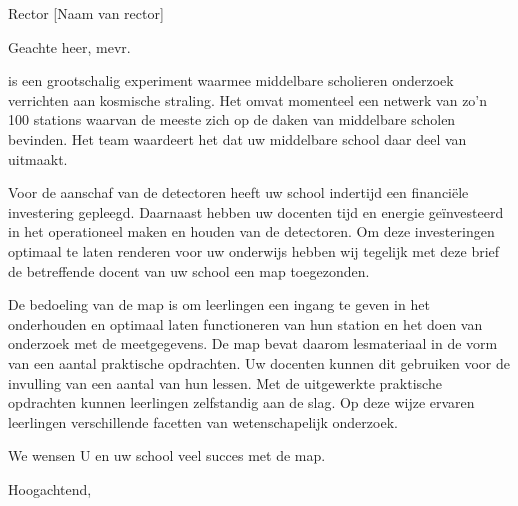 

\signature{Het \hisparc team}
\address{Science Park 105\\
         1098 XG \\
         Amsterdam}



\begin{letter}{Rector [Naam van rector] \\ [adres van school]}
 
\opening{Geachte heer, mevr.} %

\hisparc is een grootschalig experiment waarmee middelbare scholieren
onderzoek verrichten aan kosmische straling. Het omvat momenteel een
netwerk van zo'n 100 stations waarvan de meeste zich op de daken van
middelbare scholen bevinden. Het \hisparc team waardeert het dat uw
middelbare school daar deel van uitmaakt.  

Voor de aanschaf van de detectoren heeft uw school indertijd een
financiële investering gepleegd. Daarnaast hebben uw docenten tijd en
energie geïnvesteerd in het operationeel maken en houden van de
detectoren. Om deze investeringen optimaal te laten renderen voor uw
onderwijs hebben wij tegelijk met deze brief de betreffende docent van
uw school een \hisparc map toegezonden.

De bedoeling van de \hisparc map is om leerlingen een ingang te geven in
het onderhouden en optimaal laten functioneren van hun \hisparc station
en het doen van onderzoek met de meetgegevens. De \hisparc map bevat
daarom lesmateriaal in de vorm van een aantal praktische opdrachten. Uw
docenten kunnen dit gebruiken voor de invulling van een aantal van hun
lessen. Met de uitgewerkte praktische opdrachten kunnen leerlingen
zelfstandig aan de slag. Op deze wijze ervaren leerlingen verschillende
facetten van wetenschapelijk onderzoek. 

We wensen U en uw school veel succes met de \hisparc map.
 
\closing{Hoogachtend,}


\end{letter}

